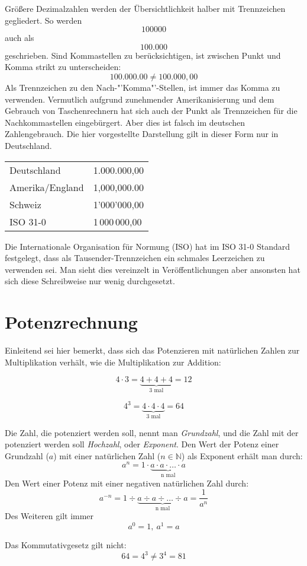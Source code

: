 Größere Dezimalzahlen werden der Übersichtlichkeit halber mit Trennzeichen gegliedert. So werden 
\[100000\]
auch als
\[100.000\]
geschrieben. Sind Kommastellen zu berücksichtigen, ist zwischen Punkt und Komma strikt zu unterscheiden:
\[100.000.00 \ne 100.000,00\]
Als Trennzeichen zu den Nach-"'Komma"'-Stellen, ist immer das Komma zu verwenden. Vermutlich aufgrund zunehmender Amerikanisierung und dem Gebrauch von Taschenrechnern hat sich auch der Punkt als Trennzeichen für die Nachkommastellen eingebürgert. Aber dies ist falsch im deutschen Zahlengebrauch. Die hier vorgestellte Darstellung gilt in dieser Form nur in Deutschland. 

\bigskip

\begin{tabular}{L{4cm}R{4cm}}
Deutschland & 1.000.000,00 \\
Amerika/England & 1,000,000.00 \\
Schweiz & 1'000'000,00 \\
ISO 31-0 & 1\,000\,000,00
\end{tabular}

\bigskip

Die Internationale Organisation für Normung (ISO) hat im ISO 31-0 Standard festgelegt, dass als Tausender-Trennzeichen ein schmales Leerzeichen zu verwenden sei. Man sieht dies vereinzelt in Veröffentlichungen aber ansonsten hat sich diese Schreibweise nur wenig durchgesetzt. 

\section{Potenzrechnung}

Einleitend sei hier bemerkt, dass sich das Potenzieren mit natürlichen Zahlen zur Multiplikation verhält, wie die Multiplikation zur Addition:

\[ 4\cdot 3 = \underbrace{4+4+4}_{\text{3 mal}} = 12 \]

\[ 4^3 = \underbrace{4\cdot 4\cdot 4}_{\text{3 mal}} = 64 \]

\begin{definition}
Die Zahl, die potenziert werden soll, nennt man \emph{Grundzahl}, und die Zahl mit der potenziert werden soll \emph{Hochzahl}, oder \emph{Exponent}. Den Wert der Potenz einer Grundzahl ($a$) mit einer natürlichen Zahl ($n \in \mathbb{N}$) als Exponent erhält man durch:
\[ a^n = 1\cdot \underbrace{a\cdot a \cdot \dots \cdot a}_{\text{n mal}} \]
Den Wert einer Potenz mit einer negativen natürlichen Zahl durch:
\[ a^{-n} = 1 \div \underbrace{a\div a \div \dots \div a}_{\text{n mal}} = \frac{1}{a^n} \]
Des Weiteren gilt immer
\[ a^0 = 1,\ a^1=a \]
\end{definition}
Das Kommutativgesetz gilt nicht:
\[ 64 = 4^3 \ne 3^4 = 81 \]


